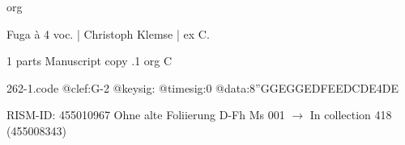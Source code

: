 \documentclass[twocolumn]{book}
\begin{document}
\newline org
\newline \begin{itshape}[f.86v, at left:] Fuga à 4 voc. | Christoph Klemse | ex C.\end{itshape} 
\newline \textcolor{darkblue}{}  1 parts  
\newline Manuscript copy
.1  org  C  
\begin{filecontents*}{262-1.code}
@clef:G-2
@keysig:
@timesig:0
@data:{8''GGEG}{GEDF}{EEDC}{DE}4DE
\end{filecontents*}
\newline
%

\newline RISM-ID: 455010967
\newline Ohne alte Foliierung
\newline D-Fh  Ms 001
\newline $\rightarrow$ In collection 418 (455008343)
\end{document}
